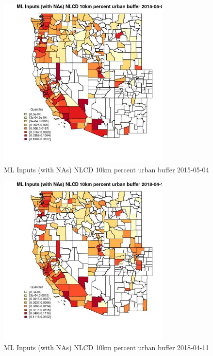 \begin{figure} 
\centering  
\includegraphics[width=0.77\textwidth]{Code_Outputs/Report_ML_input_PM25_Step4_part_e_de_duplicated_aves_compiled_2019-05-18wNAs_CountyNLCD_10km_percent_urban_bufferMean2015-05-04_2015-05-04.jpg} 
\caption{\label{fig:Report_ML_input_PM25_Step4_part_e_de_duplicated_aves_compiled_2019-05-18wNAsCountyNLCD_10km_percent_urban_bufferMean2015-05-04_2015-05-04}ML Inputs (with NAs) NLCD 10km percent urban buffer 2015-05-04} 
\end{figure} 
 

\begin{figure} 
\centering  
\includegraphics[width=0.77\textwidth]{Code_Outputs/Report_ML_input_PM25_Step4_part_e_de_duplicated_aves_compiled_2019-05-18wNAs_CountyNLCD_10km_percent_urban_bufferMean2018-04-11_2018-04-11.jpg} 
\caption{\label{fig:Report_ML_input_PM25_Step4_part_e_de_duplicated_aves_compiled_2019-05-18wNAsCountyNLCD_10km_percent_urban_bufferMean2018-04-11_2018-04-11}ML Inputs (with NAs) NLCD 10km percent urban buffer 2018-04-11} 
\end{figure} 
 

